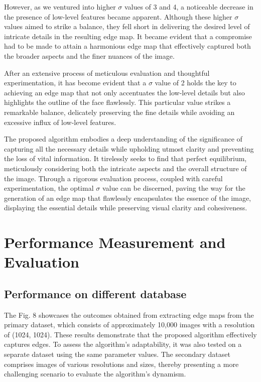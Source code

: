 \documentclass{70_styles/svproc}
\begin{document}
However, as we ventured into higher $\sigma$ values of 3 and 4, a noticeable decrease in the presence of low-level features became apparent. Although these higher $\sigma$ values aimed to strike a balance, they fell short in delivering the desired level of intricate details in the resulting edge map. It became evident that a compromise had to be made to attain a harmonious edge map that effectively captured both the broader aspects and the finer nuances of the image.

After an extensive process of meticulous evaluation and thoughtful experimentation, it has become evident that a $\sigma$ value of 2 holds the key to achieving an edge map that not only accentuates the low-level details but also highlights the outline of the face flawlessly. This particular value strikes a remarkable balance, delicately preserving the fine details while avoiding an excessive influx of low-level features.

The proposed algorithm embodies a deep understanding of the significance of capturing all the necessary details while upholding utmost clarity and preventing the loss of vital information. It tirelessly seeks to find that perfect equilibrium, meticulously considering both the intricate aspects and the overall structure of the image. Through a rigorous evaluation process, coupled with careful experimentation, the optimal $\sigma$ value can be discerned, paving the way for the generation of an edge map that flawlessly encapsulates the essence of the image, displaying the essential details while preserving visual clarity and cohesiveness.

\section{Performance Measurement and Evaluation}

\subsection{Performance on different database}
The Fig. 8 showcases the outcomes obtained from extracting edge maps from the primary dataset, which consists of approximately 10,000 images with a resolution of (1024, 1024). These results demonstrate that the proposed algorithm effectively captures edges. To assess the algorithm's adaptability, it was also tested on a separate dataset using the same parameter values. The secondary dataset comprises images of various resolutions and sizes, thereby presenting a more challenging scenario to evaluate the algorithm's dynamism.
\end{document}

